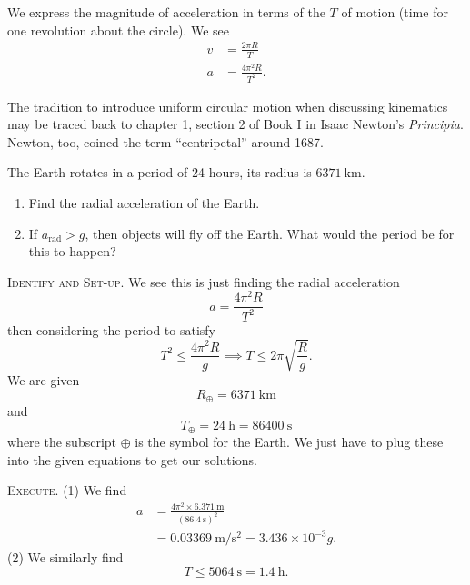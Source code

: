 We express the magnitude of acceleration in terms of the 
$T$ of motion (time for one revolution about the circle). We see
\begin{subequations}
\begin{align}
v &= \frac{2\pi R}{T}\\
a &=\frac{4\pi^{2}R}{T^{2}}.
\end{align}
\end{subequations}

\begin{rmk}
The tradition to introduce uniform circular motion when discussing
kinematics may be traced back to chapter 1, section 2 of
Book I in Isaac Newton's \emph{Principia}. Newton, too, coined the term
``centripetal'' around 1687.
\end{rmk}

\workedExamples{}

The Earth rotates in a period of 24 hours, its radius is
$\SI{6371}{\kilo\meter}$. 
\begin{enumerate}
\item Find the radial acceleration of the Earth.
\item If $a_{\text{rad}}>g$, then objects will fly off the Earth. What
  would the period be for this to happen?
\end{enumerate}

\textsc{Identify and Set-up.}
We see this is just finding the radial acceleration
\begin{equation*}
a = \frac{4\pi^{2}R}{T^{2}}
\end{equation*}
then considering the period to satisfy
\begin{equation}
T^{2}\leq \frac{4\pi^{2}R}{g} \implies
T\leq2\pi\sqrt{\frac{R}{g}}.
\end{equation}
We are given
\begin{equation}
R_{\oplus} = \SI{6371}{\kilo\meter}
\end{equation}
and
\begin{equation}
T_{\oplus} = \SI{24}{\hour} = \SI{86400}{\second}
\end{equation}
where the subscript $\oplus$ is the symbol for the Earth. We just have
to plug these into the given equations to get our solutions.

\textsc{Execute.}
(1) We find 
\begin{equation}
\begin{split}
a &= \frac{4\pi^{2}\times\SI{6.371}{\meter}}{(\SI{86.4}{\second})^{2}}\\
&= \SI{0.03369}{\meter\per\second\squared} = 3.436\times10^{-3}g.
\end{split}
\end{equation}
(2) We similarly find
\begin{equation}\label{eq:approxPeriodForEarthToThrowEverythingoffSurface}
T\leq\SI{5064}{\second}=\SI{1.4}{\hour}.
\end{equation}

